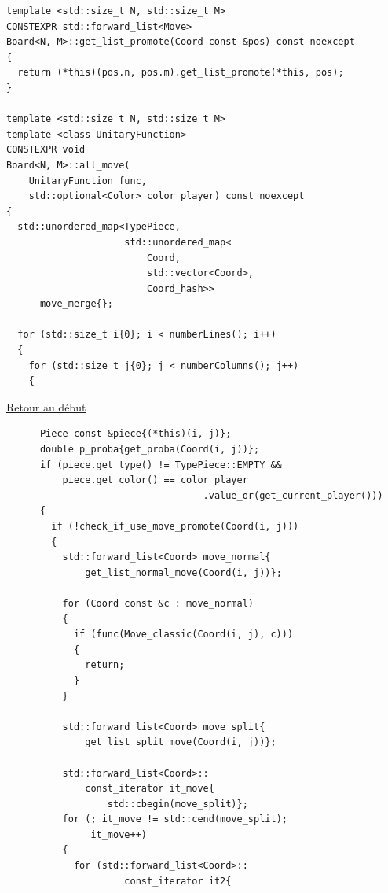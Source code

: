 {\begin{frame}[fragile]
\begin{verbatim}
template <std::size_t N, std::size_t M>
CONSTEXPR std::forward_list<Move>
Board<N, M>::get_list_promote(Coord const &pos) const noexcept
{
  return (*this)(pos.n, pos.m).get_list_promote(*this, pos);
}

template <std::size_t N, std::size_t M>
template <class UnitaryFunction>
CONSTEXPR void
Board<N, M>::all_move(
    UnitaryFunction func,
    std::optional<Color> color_player) const noexcept
{
  std::unordered_map<TypePiece,
                     std::unordered_map<
                         Coord,
                         std::vector<Coord>,
                         Coord_hash>>
      move_merge{};

  for (std::size_t i{0}; i < numberLines(); i++)
  {
    for (std::size_t j{0}; j < numberColumns(); j++)
    {
\end{verbatim}
\end{frame}

\begin{frame}[fragile]
\hyperlink{conclusion}{Retour au début}\newline
\begin{verbatim}
      Piece const &piece{(*this)(i, j)};
      double p_proba{get_proba(Coord(i, j))};
      if (piece.get_type() != TypePiece::EMPTY &&
          piece.get_color() == color_player
                                   .value_or(get_current_player()))
      {
        if (!check_if_use_move_promote(Coord(i, j)))
        {
          std::forward_list<Coord> move_normal{
              get_list_normal_move(Coord(i, j))};

          for (Coord const &c : move_normal)
          {
            if (func(Move_classic(Coord(i, j), c)))
            {
              return;
            }
          }

          std::forward_list<Coord> move_split{
              get_list_split_move(Coord(i, j))};

          std::forward_list<Coord>::
              const_iterator it_move{
                  std::cbegin(move_split)};
          for (; it_move != std::cend(move_split);
               it_move++)
          {
            for (std::forward_list<Coord>::
                     const_iterator it2{
\end{verbatim}
\end{frame}

}
